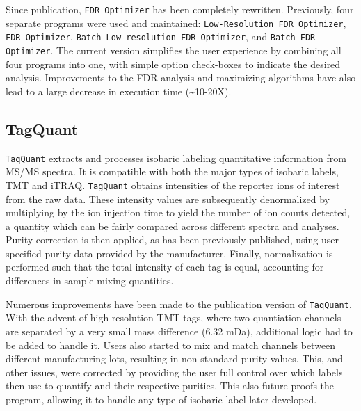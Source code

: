 Since publication, \texttt{FDR Optimizer} has been completely rewritten. Previously, four separate programs were used and maintained: \texttt{Low-Resolution FDR Optimizer}, \texttt{FDR Optimizer}, \texttt{Batch Low-resolution FDR Optimizer}, and \texttt{Batch FDR Optimizer}. The current version simplifies the user experience by combining all four programs into one, with simple option check-boxes to indicate the desired analysis. Improvements to the FDR analysis and maximizing algorithms have also lead to a large decrease in execution time (\textasciitilde10-20X).

\subsection*{TagQuant}
\texttt{TaqQuant} extracts and processes isobaric labeling quantitative information from MS/MS spectra. It is compatible with both the major types of isobaric labels, TMT and iTRAQ. \texttt{TagQuant} obtains intensities of the reporter ions of interest from the raw data. These intensity values are subsequently denormalized by multiplying by the ion injection time to yield the number of ion counts detected, a quantity which can be fairly compared across different spectra and analyses. Purity correction is then applied, as has been previously published,\cite{itracker} using user-specified purity data provided by the manufacturer. Finally, normalization is performed such that the total intensity of each tag is equal, accounting for differences in sample mixing quantities.

Numerous improvements have been made to the publication version of \texttt{TaqQuant}. With the advent of high-resolution TMT tags, where two quantiation channels are separated by a very small mass difference (6.32 mDa), additional logic had to be added to handle it. Users also started to mix and match channels between different manufacturing lots, resulting in non-standard purity values. This, and other issues, were corrected by providing the user full control over which labels then use to quantify and their respective purities. This also future proofs the program, allowing it to handle any type of isobaric label later developed.

